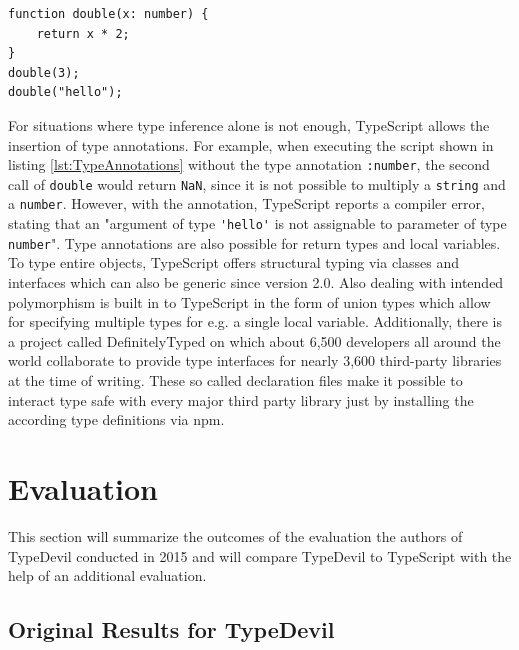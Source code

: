 \documentclass[runningheads,a4paper]{llncs}
\begin{document}
\medskip\medskip
\lstset{language=javascript}
\begin{minipage}{\linewidth}
\begin{lstlisting}[frame=single, caption=Type Annotations, label={lst:TypeAnnotations}]
function double(x: number) {
    return x * 2;
}
double(3);
double("hello");
\end{lstlisting}
\end{minipage}
For situations where type inference alone is not enough, TypeScript allows the insertion of type annotations.
For example, when executing the script shown in listing \ref{lst:TypeAnnotations} without the type annotation \lstinline[columns=fixed]{:number}, the second call of \lstinline[columns=fixed]{double} would return \lstinline[columns=fixed]{NaN}, since it is not possible to multiply a \lstinline[columns=fixed]{string} and a \lstinline[columns=fixed]{number}.
However, with the annotation, TypeScript reports a compiler error, stating that an "argument of type \lstinline[columns=fixed]{'hello'} is not assignable to parameter of type \lstinline[columns=fixed]{number}".
Type annotations are also possible for return types and local variables.
To type entire objects, TypeScript offers structural typing via classes and interfaces which can also be generic since version 2.0.
Also dealing with intended polymorphism is built in to TypeScript in the form of union types which allow for specifying multiple types for e.g. a single local variable.
Additionally, there is a project called DefinitelyTyped \cite{DefinitelyTyped} on which about 6,500 developers all around the world collaborate to provide type interfaces for nearly 3,600 third-party libraries at the time of writing.
These so called declaration files make it possible to interact type safe with every major third party library just by installing the according type definitions via npm.

\section{Evaluation}

This section will summarize the outcomes of the evaluation the authors of TypeDevil conducted in 2015 and will compare TypeDevil to TypeScript with the help of an additional evaluation.

\subsection{Original Results for TypeDevil}
\end{document}
